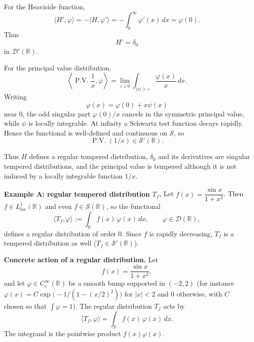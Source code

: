 \begin{solution}
For the Heaviside function,
\[
\langle H',\varphi\rangle
=
-\langle H,\varphi'\rangle
=
-\int_0^\infty\varphi'(x)\,dx
=
\varphi(0).
\]
Thus
\[
\boxed{H'=\delta_0}
\]
in \(\mathcal D'(\mathbb R)\).

For the principal value distribution,
\[
\left\langle\operatorname{P.V.}\frac1x,\varphi\right\rangle
=
\lim_{\varepsilon\downarrow0}
\int_{|x|>\varepsilon}\frac{\varphi(x)}{x}\,dx.
\]
Writing
\[
\varphi(x)=\varphi(0)+x\psi(x)
\]
near \(0\), the odd singular part
\(\varphi(0)/x\) cancels in the symmetric principal value, while
\(\psi\) is locally integrable.  At infinity a Schwartz test function
decays rapidly.  Hence the functional is well-defined and continuous on
\(\mathcal S\), so
\[
\boxed{
\operatorname{P.V.}(1/x)\in\mathcal S'(\mathbb R).
}
\]

Thus \(H\) defines a regular tempered distribution, \(\delta_0\) and its
derivatives are singular tempered distributions, and the principal value
is tempered although it is not induced by a locally integrable function
\(1/x\).
\end{solution}


\begin{problem}[CP-III-0012]
\label{prob:cp-iii-0012}
\par\smallskip\noindent\textbf{Example A: regular tempered distribution $T_f$.}\quad
Let $f(x)=\dfrac{\sin x}{1+x^2}$. Then $f\in L^1_{\mathrm{loc}}(\mathbb{R})$
and even $f\in\mathcal{S}(\mathbb{R})$, so the functional
\[
\langle T_f,\varphi\rangle := \int_{\mathbb{R}} f(x)\,\varphi(x)\,dx,
\qquad \varphi\in\mathcal{D}(\mathbb{R}),
\]
defines a regular distribution of order $0$. Since $f$ is rapidly
decreasing, $T_f$ is a tempered distribution as well
($T_f\in\mathcal{S}'(\mathbb{R})$).


\par\smallskip\noindent\textbf{Concrete action of a regular distribution.}\quad
Let
\[
f(x) = \frac{\sin x}{1+x^2},
\]
and let $\varphi\in C_c^\infty(\mathbb{R})$ be a smooth bump supported
in $(-2,2)$ (for instance
$\displaystyle \varphi(x) = C\exp\!\bigl(-1/(1-(x/2)^2)\bigr)$ for
$|x|<2$ and $0$ otherwise, with $C$ chosen so that $\int\varphi=1$).
The regular distribution $T_f$ acts by
\[
\langle T_f,\varphi\rangle
= \int_{\mathbb{R}} f(x)\,\varphi(x)\,dx.
\]
The integrand is the pointwise product $f(x)\varphi(x)$.
\end{problem}

